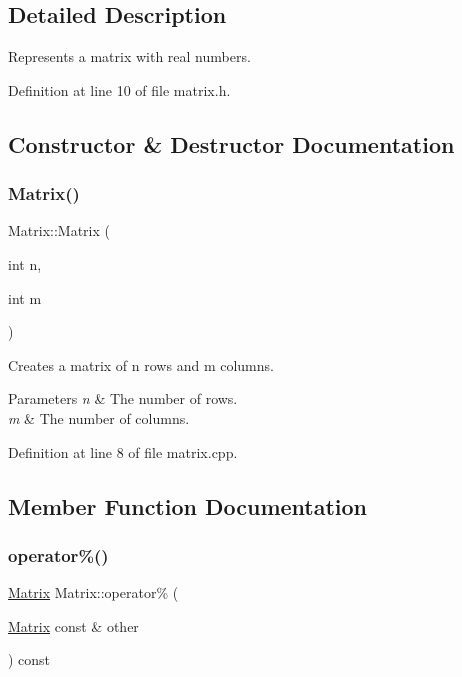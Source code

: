\subsection{Detailed Description}
Represents a matrix with real numbers. 

Definition at line 10 of file matrix.\+h.



\subsection{Constructor \& Destructor Documentation}
\mbox{\label{classMatrix_ae157f910061b3e1155b17b62583bde57}} 
\subsubsection{\texorpdfstring{Matrix()}{Matrix()}}
{\footnotesize\ttfamily Matrix\+::\+Matrix (\begin{DoxyParamCaption}\item[{int}]{n,  }\item[{int}]{m }\end{DoxyParamCaption})}

Creates a matrix of {\ttfamily n} rows and {\ttfamily m} columns.


\begin{DoxyParams}{Parameters}
{\em n} & The number of rows. \\
\hline
{\em m} & The number of columns. \\
\hline
\end{DoxyParams}


Definition at line 8 of file matrix.\+cpp.



\subsection{Member Function Documentation}
\mbox{\label{classMatrix_aef843067e6c43218c7c909b6367706c2}} 
\subsubsection{\texorpdfstring{operator\%()}{operator\%()}}
{\footnotesize\ttfamily \hyperlink{classMatrix}{Matrix} Matrix\+::operator\% (\begin{DoxyParamCaption}\item[{\hyperlink{classMatrix}{Matrix} const \&}]{other }\end{DoxyParamCaption}) const}

